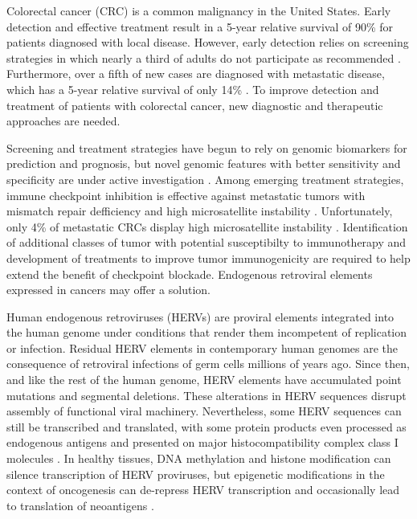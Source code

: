 Colorectal cancer (CRC) is a common malignancy in the United States.
Early detection and effective treatment result in a 5-year relative survival of 90\% for patients diagnosed with local disease.
However, early detection relies on screening strategies in which nearly a third of adults do not participate as recommended \citep{CDC2019}.
Furthermore, over a fifth of new cases are diagnosed with metastatic disease, which has a 5-year relative survival of only 14\% \citep{SEER2020}.
To improve detection and treatment of patients with colorectal cancer, new diagnostic and therapeutic approaches are needed.

Screening and treatment strategies have begun to rely on genomic biomarkers for prediction and prognosis, but novel genomic features with better sensitivity and specificity are under active investigation \citep{Imperiale2014, Sveen2020}.
Among emerging treatment strategies, immune checkpoint inhibition is effective against metastatic tumors with mismatch repair defficiency and high microsatellite instability \citep{Le2015, Overman2018}.
Unfortunately, only 4\% of metastatic CRCs display high microsatellite instability \citep{Ganesh2019}.
Identification of additional classes of tumor with potential susceptibilty to immunotherapy and development of treatments to improve tumor immunogenicity are required to help extend the benefit of checkpoint blockade.
Endogenous retroviral elements expressed in cancers may offer a solution.

Human endogenous retroviruses (HERVs) are proviral elements integrated into the human genome under conditions that render them incompetent of replication or infection.
Residual HERV elements in contemporary human genomes are the consequence of retroviral infections of germ cells millions of years ago.
Since then, and like the rest of the human genome, HERV elements have accumulated point mutations and segmental deletions.
These alterations in HERV sequences disrupt assembly of functional viral machinery.
Nevertheless, some HERV sequences can still be transcribed and translated, with some protein products even processed as endogenous antigens and presented on major histocompatibility complex class I molecules \citep{Boller1997, Rooney2015}.
In healthy tissues, DNA methylation and histone modification can silence transcription of HERV proviruses, but epigenetic modifications in the context of oncogenesis can de-repress HERV transcription and occasionally lead to translation of neoantigens \citep{Menendez2004, Wiesner2015}.

